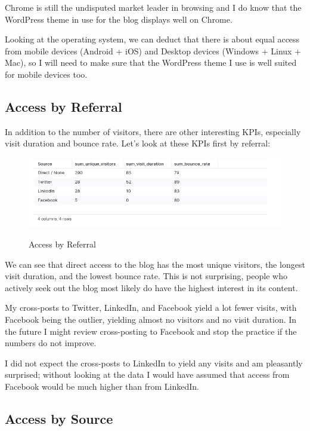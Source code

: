 Chrome is still the undisputed market leader in browsing and I do know that the WordPress theme in use for the blog displays well on Chrome. 

Looking at the operating system, we can deduct that there is about equal access from mobile devices (Android + iOS) and Desktop devices (Windows + Linux + Mac), so I will need to make sure that the WordPress theme I use is well suited for mobile devices too.

\subsection{Access by Referral}

In addition to the number of visitors, there are other interesting KPIs, especially visit duration and bounce rate. Let's look at these KPIs first by referral:

\begin{figure}[H]
\centering
\caption {Access by Referral}
\includegraphics[width=\linewidth]{images/access-referral.png}
\label{fig:accessReferral}
\end{figure}

We can see that direct access to the blog has the most unique visitors, the longest visit duration, and the lowest bounce rate. This is not surprising, people who actively seek out the blog most likely do have the highest interest in its content.

My cross-posts to Twitter, LinkedIn, and Facebook yield a lot fewer visits, with Facebook being the outlier, yielding almost no visitors and no visit duration. In the future I might review cross-posting to Facebook and stop the practice if the numbers do not improve. 

I did not expect the cross-posts to LinkedIn to yield any visits and am pleasantly surprised; without looking at the data I would have assumed that access from Facebook would be much higher than from LinkedIn.

\subsection{Access by Source}

